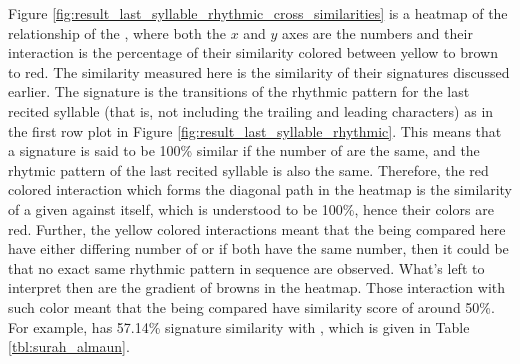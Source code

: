 Figure \ref{fig:result_last_syllable_rhythmic_cross_similarities} is a heatmap of the relationship of the  , where both the $x$ and $y$ axes are the   numbers and their interaction is the percentage of their similarity colored between yellow to brown to red. The similarity measured here is the similarity of their signatures discussed earlier. The signature is the transitions of the rhythmic pattern for the last recited syllable (that is, not including the trailing and leading characters) as in the first row plot in Figure \ref{fig:result_last_syllable_rhythmic}. This means that a signature is said to be 100\% similar if the number of   are the same, and the rhytmic pattern of the last recited syllable is also the same. Therefore, the red colored interaction which forms the diagonal path in the heatmap is the similarity of a given   against itself, which is understood to be 100\%, hence their colors are red. Further, the yellow colored interactions meant that the   being compared here have either differing number of   or if both have the same number, then it could be that no exact same rhythmic pattern in sequence are observed. What's left to interpret then are the gradient of browns in the heatmap. Those interaction with such color meant that the   being compared have similarity score of around 50\%. For example,   has 57.14\% signature similarity with  , which is given in Table \ref{tbl:surah_almaun}. 

